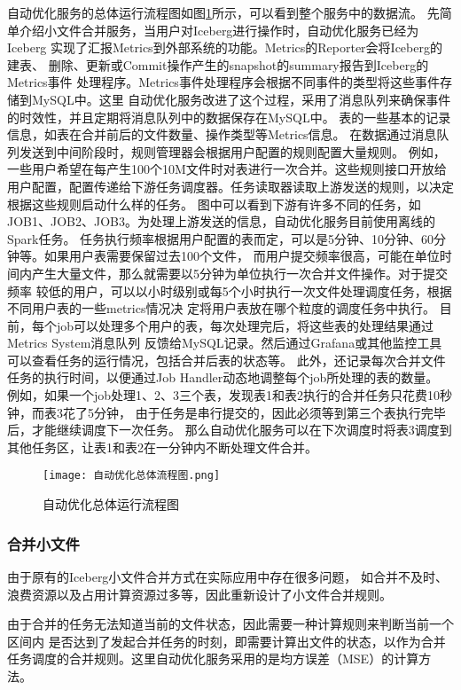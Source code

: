 自动优化服务的总体运行流程图如图\ref{fig:自动优化总体运行流程图}所示，可以看到整个服务中的数据流。
先简单介绍小文件合并服务，当用户对Iceberg进行操作时，自动优化服务已经为Iceberg
实现了汇报Metrics到外部系统的功能。Metrics的Reporter会将Iceberg的建表、
删除、更新或Commit操作产生的snapshot的summary报告到Iceberg的Metrics事件
处理程序。Metrics事件处理程序会根据不同事件的类型将这些事件存储到MySQL中。这里
自动优化服务改进了这个过程，采用了消息队列来确保事件的时效性，并且定期将消息队列中的数据保存在MySQL中。
表的一些基本的记录信息，如表在合并前后的文件数量、操作类型等Metrics信息。
在数据通过消息队列发送到中间阶段时，规则管理器会根据用户配置的规则配置大量规则。
例如，一些用户希望在每产生100个10M文件时对表进行一次合并。这些规则接口开放给
用户配置，配置传递给下游任务调度器。任务读取器读取上游发送的规则，以决定根据这些规则启动什么样的任务。
图中可以看到下游有许多不同的任务，如JOB1、JOB2、JOB3。为处理上游发送的信息，自动优化服务目前使用离线的Spark任务。
任务执行频率根据用户配置的表而定，可以是5分钟、10分钟、60分钟等。如果用户表需要保留过去100个文件，
而用户提交频率很高，可能在单位时间内产生大量文件，那么就需要以5分钟为单位执行一次合并文件操作。对于提交频率
较低的用户，可以以小时级别或每5个小时执行一次文件处理调度任务，根据不同用户表的一些metrics情况决
定将用户表放在哪个粒度的调度任务中执行。
目前，每个job可以处理多个用户的表，每次处理完后，将这些表的处理结果通过Metrics System消息队列
反馈给MySQL记录。然后通过Grafana或其他监控工具可以查看任务的运行情况，包括合并后表的状态等。
此外，还记录每次合并文件任务的执行时间，以便通过Job Handler动态地调整每个job所处理的表的数量。
例如，如果一个job处理1、2、3三个表，发现表1和表2执行的合并任务只花费10秒钟，而表3花了5分钟，
由于任务是串行提交的，因此必须等到第三个表执行完毕后，才能继续调度下一次任务。
那么自动优化服务可以在下次调度时将表3调度到其他任务区，让表1和表2在一分钟内不断处理文件合并。

\begin{figure}[H]
  \centering
  \texttt{[image: 自动优化总体流程图.png]}
  \caption{自动优化总体运行流程图}
  \label{fig:自动优化总体运行流程图}
\end{figure}

\subsubsection{合并小文件}

由于原有的Iceberg小文件合并方式在实际应用中存在很多问题，
如合并不及时、浪费资源以及占用计算资源过多等，因此重新设计了小文件合并规则。

由于合并的任务无法知道当前的文件状态，因此需要一种计算规则来判断当前一个区间内
是否达到了发起合并任务的时刻，即需要计算出文件的状态，以作为合并任务调度的合并规则。这里自动优化服务采用的是均方误差（MSE）的计算方法。

